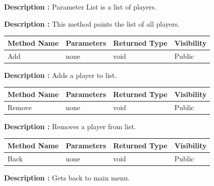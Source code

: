 \documentclass[12pt]{article}
\begin{document}
\textbf{Description :} Parameter List is a list of players.

\textbf{Description :} This method paints the list of all players.

\begin{table}[H]
    \begin{tabular}{|l|l|l|l|}
    \hline
    \rowcolor[HTML]{EFEFEF} 
    \cellcolor[HTML]{EFEFEF}\textbf{Method Name} & \textbf{Parameters}                    & \textbf{Returned Type} & \textbf{Visibility} \\ \hline
    Add                                          & none                                   & void                   & Public             \\ \hline
    \end{tabular}
\end{table}

\textbf{Description :} Adds a player to list.

\begin{table}[H]
    \begin{tabular}{|l|l|l|l|}
    \hline
    \rowcolor[HTML]{EFEFEF} 
    \cellcolor[HTML]{EFEFEF}\textbf{Method Name} & \textbf{Parameters}                    & \textbf{Returned Type} & \textbf{Visibility} \\ \hline
    Remove                                       & none                                   & void                   & Public             \\ \hline
    \end{tabular}
\end{table}

\textbf{Description :} Removes a player from list.

\begin{table}[H]
    \begin{tabular}{|l|l|l|l|}
    \hline
    \rowcolor[HTML]{EFEFEF} 
    \cellcolor[HTML]{EFEFEF}\textbf{Method Name} & \textbf{Parameters}                    & \textbf{Returned Type} & \textbf{Visibility} \\ \hline
    Back                                         & none                                   & void                   & Public             \\ \hline
    \end{tabular}
\end{table}

\textbf{Description :} Gets back to main menu.

\newpage
\end{document}
